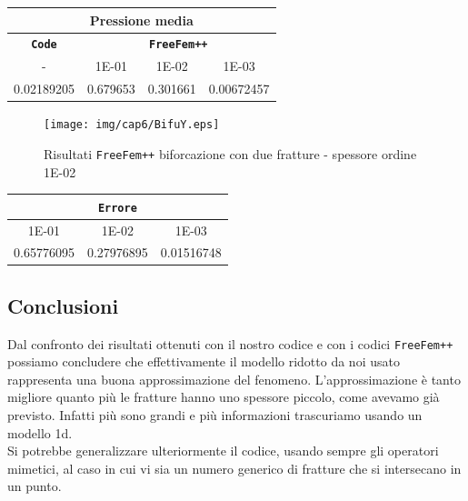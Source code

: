 \begin{center}
\begin{tabular}{|c|c|c|c|}
\hline
\multicolumn{4}{|c|}{Pressione media} \\
\hline
\textbf{\texttt{Code}} & \multicolumn{3}{|c|}{\textbf{\texttt{FreeFem++}}} \\
\hline
- & \multicolumn{1}{|c|}{1E-01} & 1E-02 & 1E-03 \\
\hline
0.02189205 & 0.679653 & 0.301661 & 0.00672457 \\
\hline
\end{tabular}
\end{center}

\begin{figure}[h!]
\centering
\texttt{[image: img/cap6/BifuY.eps]}
\caption{Risultati \texttt{FreeFem++} biforcazione con due fratture - spessore ordine 1E-02 }\label{Biforcazione2Frat1E-02}
\end{figure}

\begin{center}
\begin{tabular}{|c|c|c|}
\hline
  \multicolumn{3}{|c|}{\textbf{\texttt{Errore}}} \\ 
\hline
\multicolumn{1}{|c|}{1E-01} & 1E-02 & 1E-03 \\
\hline
0.65776095 & 0.27976895 & 0.01516748 \\
\hline
\end{tabular}
\end{center}

\subsection{Conclusioni}
Dal confronto dei risultati ottenuti con il nostro codice e con i codici \texttt{FreeFem++} possiamo concludere che effettivamente il modello ridotto da noi usato rappresenta una buona approssimazione del fenomeno. L'approssimazione è tanto migliore quanto più le fratture hanno uno spessore piccolo, come avevamo già previsto. Infatti più sono grandi e più informazioni trascuriamo usando un modello 1d. \\
\noindent Si potrebbe generalizzare ulteriormente il codice, usando sempre gli operatori mimetici, al caso in cui vi sia un numero generico di fratture che si intersecano in un punto. 
